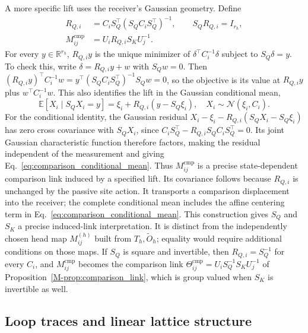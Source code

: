 \documentclass[twoside,11pt]{article}
\begin{document}
A more specific lift uses the receiver's Gaussian geometry. Define
\begin{align}
R_{Q,i}&=C_iS_Q^\top(S_QC_iS_Q^\top)^{-1},\qquad S_QR_{Q,i}=I_{r_h},\\
M_{ij}^{\mathrm{cmp}}
&=U_iR_{Q,i}S_KU_j^{-1}.
\label{eq:comparison_gaussian_lift}
\end{align}
For every $y\in\mathbb R^{r_h}$, $R_{Q,i}y$ is the unique minimizer of $\delta^\top C_i^{-1}\delta$ subject to $S_Q\delta=y$. To check this, write $\delta=R_{Q,i}y+w$ with $S_Qw=0$. Then $(R_{Q,i}y)^\top C_i^{-1}w=y^\top(S_QC_iS_Q^\top)^{-1}S_Qw=0$, so the objective is its value at $R_{Q,i}y$ plus $w^\top C_i^{-1}w$. This also identifies the lift in the Gaussian conditional mean,
\begin{equation}
\mathbb E[X_i\mid S_QX_i=y]
=\xi_i+R_{Q,i}(y-S_Q\xi_i),
\quad X_i\sim\mathcal N(\xi_i,C_i).
\label{eq:comparison_conditional_mean}
\end{equation}
For the conditional identity, the Gaussian residual $X_i-\xi_i-R_{Q,i}(S_QX_i-S_Q\xi_i)$ has zero cross covariance with $S_QX_i$, since $C_iS_Q^\top-R_{Q,i}S_QC_iS_Q^\top=0$. Its joint Gaussian characteristic function therefore factors, making the residual independent of the measurement and giving Eq.~\eqref{eq:comparison_conditional_mean}. Thus $M_{ij}^{\mathrm{cmp}}$ is a precise state-dependent comparison link induced by a specified lift. Its covariance follows because $R_{Q,i}$ is unchanged by the passive site action. It transports a comparison displacement into the receiver; the complete conditional mean includes the affine centering term in Eq.~\eqref{eq:comparison_conditional_mean}. This construction gives $S_Q$ and $S_K$ a precise induced-link interpretation. It is distinct from the independently chosen head map $M_{ij}^{(h)}$ built from $T_h,\widetilde O_h$; equality would require additional conditions on those maps. If $S_Q$ is square and invertible, then $R_{Q,i}=S_Q^{-1}$ for every $C_i$, and $M^{\mathrm{cmp}}_{ij}$ becomes the comparison link $\Theta^{\mathrm{cmp}}_{ij}=U_iS_Q^{-1}S_KU_j^{-1}$ of Proposition~\ref{M-prop:comparison_link}, which is group valued when $S_K$ is invertible as well.

\subsection{Loop traces and linear lattice structure}
\label{supp:loop_traces}
\end{document}
